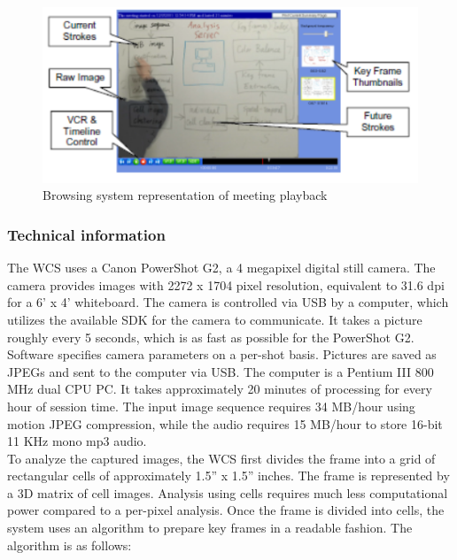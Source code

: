 \documentclass{article}
\begin{document}
\begin{figure}[H]
\centering
\includegraphics[scale=0.80]{images/research_mswhiteboard_1}
\caption{Browsing system representation of meeting playback}
\label{fig:research_mswhiteboard_1}
\end{figure}

		\subsubsection*{Technical information}
The WCS uses a Canon PowerShot G2, a 4 megapixel digital still camera.  The camera provides images with 2272 x 1704 pixel resolution, equivalent to 31.6 dpi for a 6' x 4' whiteboard.  The camera is controlled via USB by a computer, which utilizes the available SDK for the camera to communicate.  It takes a picture roughly every 5 seconds, which is as fast as possible for the PowerShot G2.  Software specifies camera parameters on a per-shot basis.  Pictures are saved as JPEGs and sent to the computer via USB.  The computer is a Pentium III 800 MHz dual CPU PC.  It takes approximately 20 minutes of processing for every hour of session time.  The input image sequence requires 34 MB/hour using motion JPEG compression, while the audio requires 15 MB/hour to store 16-bit 11 KHz mono mp3 audio.  \\

To analyze the captured images, the WCS first divides the frame into a grid of rectangular cells of approximately 1.5'' x 1.5'' inches.  The frame is represented by a 3D matrix of cell images.  Analysis using cells requires much less computational power compared to a per-pixel analysis.  Once the frame is divided into cells, the system uses an algorithm to prepare key frames in a readable fashion.  The algorithm is as follows:
\end{document}
